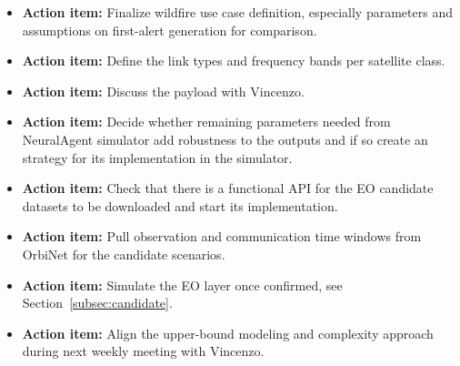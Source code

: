 \documentclass[11pt]{article}
\newcommand{\actionitem}[1]{\textcolor{todo}{\textbf{Action item:}} #1}
\begin{document}
\begin{itemize}[leftmargin=1.2cm]
    \item \actionitem{Finalize wildfire use case definition, especially parameters and assumptions on first-alert generation for comparison.}
     \item \actionitem{Define the link types and frequency bands per satellite class.}
    \item \actionitem{Discuss the payload with Vincenzo.}
    \item \actionitem{Decide whether remaining parameters needed from NeuralAgent simulator add robustness to the outputs and if so create an strategy for its implementation in the simulator.}
    \item \actionitem{Check that there is a functional API for the EO candidate datasets to be downloaded and start its implementation.}
    \item \actionitem{Pull observation and communication time windows from OrbiNet for the candidate scenarios.}
    \item \actionitem{Simulate the EO layer once confirmed, see Section~\ref{subsec:candidate}.}
    \item \actionitem{Align the upper-bound modeling and complexity approach during next weekly meeting with Vincenzo.}
\end{itemize}

\printbibliography
\end{document}
